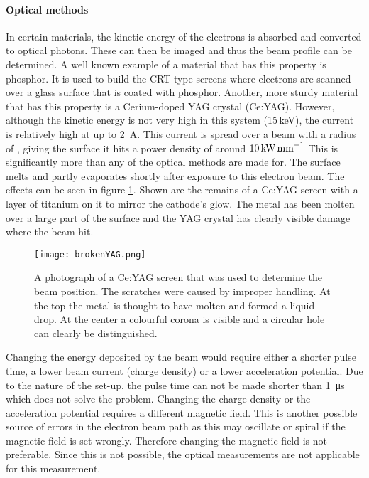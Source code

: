 \paragraph{Optical methods}
In certain materials, the kinetic energy of the electrons is absorbed and converted to optical photons.  These can then be imaged and thus the beam profile can be determined. A well known example of a material that has this property is phosphor. It is used to build the CRT-type screens where electrons are scanned over a glass surface that is coated with phosphor.
Another, more sturdy material that has this property is a Cerium-doped YAG crystal (Ce:YAG). 
However, although the kinetic energy is not very high in this system (15\,keV), the current is relatively high at up to \SI{2}{\ampere}. This current is spread over a beam with a radius of , giving the surface it hits a power density of around $10\,\text{kW\,mm}^{-1}$
This is significantly more than any of the optical methods are made for. The surface melts and partly evaporates shortly after exposure to this electron beam. 
The effects can be seen in figure \ref{fig:brokenyag}. Shown are the remains of a Ce:YAG screen with a layer of titanium on it to mirror the cathode's glow. The metal has been molten over a large part of the surface and the YAG crystal has clearly visible damage where the beam hit. 
\begin{figure}[h]
 \centering
 \texttt{[image: brokenYAG.png]}
 \caption{A photograph of a Ce:YAG screen that was used to determine the beam position. The scratches were caused by improper handling. At the top the metal is thought to have molten and formed a liquid drop. At the center a colourful corona is visible and a circular hole can clearly be distinguished.}
 \label{fig:brokenyag}
\end{figure}

Changing the energy deposited by the beam would require either a shorter pulse time, a lower beam current (charge density) or a lower acceleration potential.
Due to the nature of the set-up, the pulse time can not be made shorter than \SI{1}{\micro\second} which does not solve the problem. Changing the charge density or the acceleration potential requires a different magnetic field. 
This is another possible source of errors in the electron beam path as this may oscillate or spiral if the magnetic field is set wrongly. Therefore changing the magnetic field is not preferable.
Since this is not possible, the optical measurements are not applicable for this measurement.

